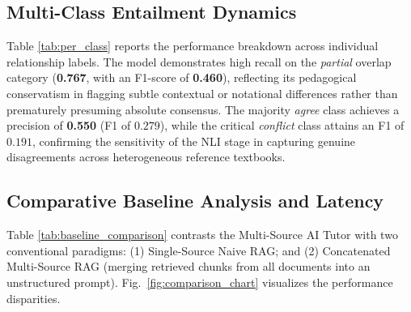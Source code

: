 \documentclass[conference]{IEEEtran}
\begin{document}
\begin{table}[htbp]
\caption{Performance Stratification by Question Difficulty}
\label{tab:difficulty_breakdown}
\centering
{}
\end{table}

\subsection{Multi-Class Entailment Dynamics}
Table \ref{tab:per_class} reports the performance breakdown across individual relationship labels. The model demonstrates high recall on the \textit{partial} overlap category (\textbf{0.767}, with an F1-score of \textbf{0.460}), reflecting its pedagogical conservatism in flagging subtle contextual or notational differences rather than prematurely presuming absolute consensus. The majority \textit{agree} class achieves a precision of \textbf{0.550} (F1 of $0.279$), while the critical \textit{conflict} class attains an F1 of $0.191$, confirming the sensitivity of the NLI stage in capturing genuine disagreements across heterogeneous reference textbooks.

\begin{table}[htbp]
\caption{Detailed Cross-Source NLI Classification Performance}
\label{tab:per_class}
\centering
{}
\end{table}

\subsection{Comparative Baseline Analysis and Latency}
Table \ref{tab:baseline_comparison} contrasts the Multi-Source AI Tutor with two conventional paradigms: (1) Single-Source Naive RAG; and (2) Concatenated Multi-Source RAG (merging retrieved chunks from all documents into an unstructured prompt). Fig.~\ref{fig:comparison_chart} visualizes the performance disparities.
\end{document}
